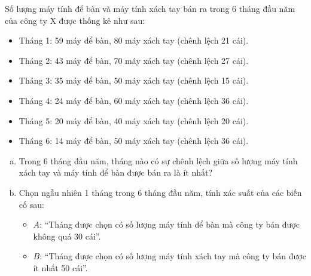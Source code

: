 \begin{bt}%
Số lượng máy tính để bàn và máy tính xách tay bán ra trong 6 tháng đầu năm của công ty X được thống kê như sau:
\begin{itemize}
    \item Tháng 1: 59 máy để bàn, 80 máy xách tay (chênh lệch 21 cái).
    \item Tháng 2: 43 máy để bàn, 70 máy xách tay (chênh lệch 27 cái).
    \item Tháng 3: 35 máy để bàn, 50 máy xách tay (chênh lệch 15 cái).
    \item Tháng 4: 24 máy để bàn, 60 máy xách tay (chênh lệch 36 cái).
    \item Tháng 5: 20 máy để bàn, 40 máy xách tay (chênh lệch 20 cái).
    \item Tháng 6: 14 máy để bàn, 50 máy xách tay (chênh lệch 36 cái).
\end{itemize}
\begin{enumerate}[a)]
    \item Trong 6 tháng đầu năm, tháng nào có sự chênh lệch giữa số lượng máy tính xách tay và máy tính để bàn được bán ra là ít nhất?
    \item Chọn ngẫu nhiên 1 tháng trong 6 tháng đầu năm, tính xác suất của các biến cố sau:
    \begin{itemize}
        \item $A$: “Tháng được chọn có số lượng máy tính để bàn mà công ty bán được không quá 30 cái”.
        \item $B$: “Tháng được chọn có số lượng máy tính xách tay mà công ty bán được ít nhất 50 cái”.
    \end{itemize}
\end{enumerate}
\end{bt}
